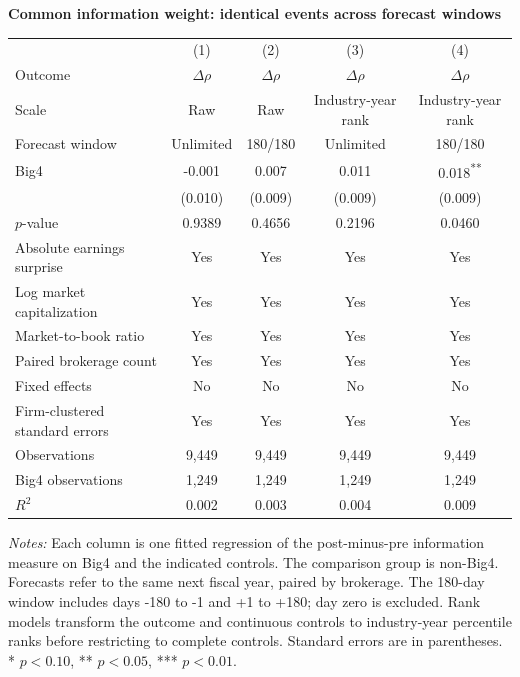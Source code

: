 \documentclass[10pt]{article}
\newcommand{\sym}[1]{\textsuperscript{#1}}
\begin{document}
\begin{minipage}{18.4cm}
\fontsize{10}{12}\selectfont
\setlength{\tabcolsep}{4pt}\renewcommand{\arraystretch}{1.12}
{\large\bfseries Common information weight: identical events across forecast windows}\par\medskip
\begin{tabular*}{\linewidth}{@{\extracolsep{\fill}}lcccc@{}}
\toprule
 & (1) & (2) & (3) & (4) \\
Outcome & $\Delta\rho$ & $\Delta\rho$ & $\Delta\rho$ & $\Delta\rho$ \\
Scale & Raw & Raw & Industry-year rank & Industry-year rank \\
Forecast window & Unlimited & 180/180 & Unlimited & 180/180 \\
\midrule
Big4 & -0.001 & 0.007 & 0.011 & 0.018\sym{**} \\
 & (0.010) & (0.009) & (0.009) & (0.009) \\
$p$-value & 0.9389 & 0.4656 & 0.2196 & 0.0460 \\
\midrule
Absolute earnings surprise & Yes & Yes & Yes & Yes \\
Log market capitalization & Yes & Yes & Yes & Yes \\
Market-to-book ratio & Yes & Yes & Yes & Yes \\
Paired brokerage count & Yes & Yes & Yes & Yes \\
Fixed effects & No & No & No & No \\
Firm-clustered standard errors & Yes & Yes & Yes & Yes \\
Observations & 9,449 & 9,449 & 9,449 & 9,449 \\
Big4 observations & 1,249 & 1,249 & 1,249 & 1,249 \\
$R^2$ & 0.002 & 0.003 & 0.004 & 0.009 \\
\bottomrule\end{tabular*}\par\medskip
\fontsize{9}{11}\selectfont\textit{Notes:} Each column is one fitted regression of the post-minus-pre information measure on Big4 and the indicated controls. The comparison group is non-Big4. Forecasts refer to the same next fiscal year, paired by brokerage. The 180-day window includes days -180 to -1 and +1 to +180; day zero is excluded. Rank models transform the outcome and continuous controls to industry-year percentile ranks before restricting to complete controls. Standard errors are in parentheses. * $p<0.10$, ** $p<0.05$, *** $p<0.01$.
\end{minipage}
\end{document}

